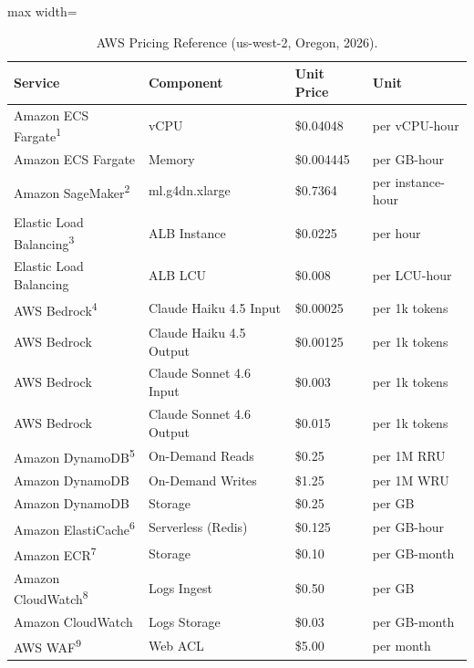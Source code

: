 \begin{table}[H]
    \centering
    \caption{AWS Pricing Reference (us-west-2, Oregon, 2026).}
    \label{tab:aws_pricing_ref}
    \scriptsize
    \begin{adjustbox}{max width=\linewidth}
    \begin{tabular}{lllp{3.2cm}}
        \toprule
        \textbf{Service} & \textbf{Component} & \textbf{Unit Price} & \textbf{Unit} \\
        \midrule
        Amazon ECS Fargate\textsuperscript{1} & vCPU & \$0.04048 & per vCPU-hour \\
        Amazon ECS Fargate & Memory & \$0.004445 & per GB-hour \\
        \midrule
        Amazon SageMaker\textsuperscript{2} & ml.g4dn.xlarge & \$0.7364 & per instance-hour \\
        \midrule
        Elastic Load Balancing\textsuperscript{3} & ALB Instance & \$0.0225 & per hour \\
        Elastic Load Balancing & ALB LCU & \$0.008 & per LCU-hour \\
        \midrule
        AWS Bedrock\textsuperscript{4} & Claude Haiku 4.5 Input & \$0.00025 & per 1k tokens \\
        AWS Bedrock & Claude Haiku 4.5 Output & \$0.00125 & per 1k tokens \\
        AWS Bedrock & Claude Sonnet 4.6 Input & \$0.003 & per 1k tokens \\
        AWS Bedrock & Claude Sonnet 4.6 Output & \$0.015 & per 1k tokens \\
        \midrule
        Amazon DynamoDB\textsuperscript{5} & On-Demand Reads & \$0.25 & per 1M RRU \\
        Amazon DynamoDB & On-Demand Writes & \$1.25 & per 1M WRU \\
        Amazon DynamoDB & Storage & \$0.25 & per GB \\
        \midrule
        Amazon ElastiCache\textsuperscript{6} & Serverless (Redis) & \$0.125 & per GB-hour \\
        \midrule
        Amazon ECR\textsuperscript{7} & Storage & \$0.10 & per GB-month \\
        \midrule
        Amazon CloudWatch\textsuperscript{8} & Logs Ingest & \$0.50 & per GB \\
        Amazon CloudWatch & Logs Storage & \$0.03 & per GB-month \\
        \midrule
        AWS WAF\textsuperscript{9} & Web ACL & \$5.00 & per month \\

\end{tabular}
\end{adjustbox}
\end{table}
